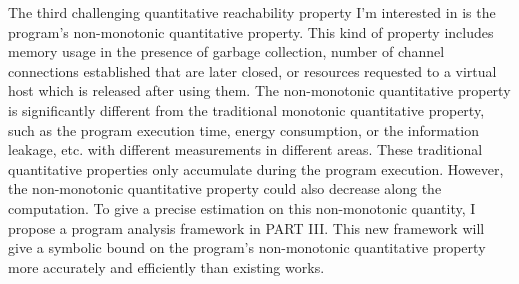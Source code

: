 {
 The third challenging quantitative reachability property I'm interested in is the program's {non-monotonic} quantitative property.
 This kind of property includes memory usage in the presence of garbage collection,
number of channel connections established that are later closed,
or resources requested to a virtual host which is released after using them. 
The non-monotonic quantitative property is significantly different from the traditional monotonic quantitative property,
such as the program execution time, energy consumption,
or the information leakage, etc. with different measurements in different areas.
These traditional quantitative properties only accumulate during the program execution. 
However, the non-monotonic quantitative property could also decrease along the computation.
To give a precise estimation on this {non-monotonic} quantity, I propose a program analysis framework in PART III.
This new framework will give
a symbolic bound on the program's non-monotonic quantitative property more accurately and efficiently
than existing works.
}
%
